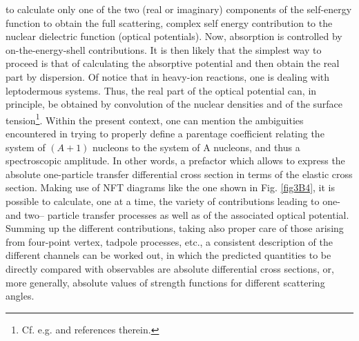 to calculate only one of the two (real or imaginary)
components of the self-energy function to obtain the
full scattering, complex self energy contribution to the nuclear dielectric function
(optical potentials). Now, absorption is controlled
by on-the-energy-shell contributions. It is then likely that the simplest way to proceed is
that of calculating the absorptive potential and then
obtain the real part by dispersion. Of notice that in heavy-ion reactions,
one is dealing with leptodermous systems. Thus, the
real part of the optical potential can, in principle, be
obtained by convolution of the nuclear densities and
of the surface tension\footnote{Cf. e.g. \cite{Broglia:04a} and references therein.}. Within the present context, one can mention the
ambiguities encountered in trying to properly define
a parentage coefficient relating the system of $(A +
1)$ nucleons to the system of A nucleons, and thus
a spectroscopic amplitude. In other words, a prefactor which allows to express the absolute one-particle transfer differential
cross section in terms of the elastic cross section.
Making use of NFT diagrams like the one shown
in Fig. \ref{fig3B4}, it is possible to calculate, one at a time,
the variety of contributions leading to one- and two-- particle
transfer processes as well as of the associated optical potential. Summing up the different
contributions, taking also proper care of those arising
from four-point vertex, tadpole processes, etc., a
consistent description of the different channels can be
worked out, in which the predicted quantities to be
directly compared with observables are absolute differential
cross sections, or, more generally, absolute
values of strength functions for different scattering
angles.
